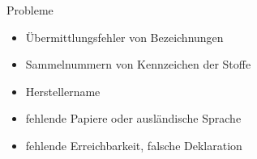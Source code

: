 \begin{sectionbox}{Probleme}
    \begin{itemize}
        \item Übermittlungsfehler von Bezeichnungen
        \item Sammelnummern von Kennzeichen der Stoffe
        \item Herstellername
        \item fehlende Papiere oder ausländische Sprache
        \item fehlende Erreichbarkeit, falsche Deklaration
    \end{itemize}
\end{sectionbox}